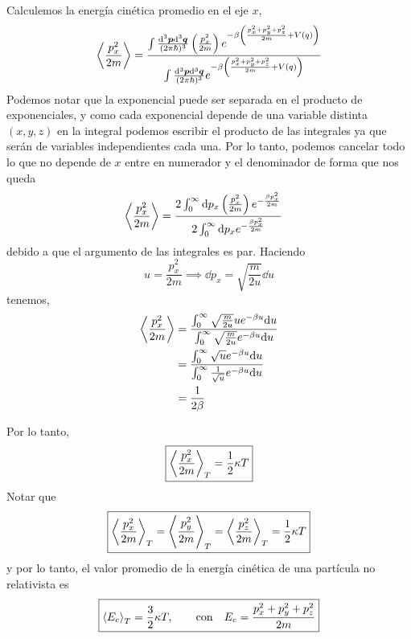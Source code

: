 Calculemos la energía cinética promedio en el eje $x$,
\begin{equation}
  \ev{\frac{p_x^2}{2m}}=\frac{\intpq\left(\frac{p_x^2}{2m}\right)e^{-\b\left(\frac{p_x^2+p_y^2+p_z^2}{2m}+V(q)\right)}}{\intpq e^{-\b\left(\frac{p_x^2+p_y^2+p_z^2}{2m}+V(q)\right)}}
\end{equation}
Podemos notar que la exponencial puede ser separada en el producto de exponenciales, y como cada exponencial depende de una variable distinta $(x,y,z)$ en la integral podemos escribir el producto de las integrales ya que serán de variables independientes cada una. Por lo tanto, podemos cancelar todo lo que no depende de $x$ entre en numerador y el denominador de forma que nos queda
\begin{align}
   \ev{\frac{p_x^2}{2m}}&=\frac{2\int_0^\infty \dd p_x\left(\frac{p_x^2}{2m}\right)e^{-\frac{\b p_x^2}{2m}}}{2\int_0^\infty \dd p_xe^{-\frac{\b p_x^2}{2m}}}
\end{align}
debido a que el argumento de las integrales es par.
Haciendo
\begin{equation}
  u=\frac{p_x^2}{2m}\implies \dd p_x=\sqrt{\frac{m}{2u}}\dd u
\end{equation}
tenemos,
\begin{align}
  \ev{\frac{p_x^2}{2m}}&=\frac{\int_0^\infty \sqrt{\frac{m}{2u}} u e^{-\b u}\dd u}{\int_0^\infty \sqrt{\frac{m}{2u}}e^{-\b u}\dd u}\\
  &=\frac{\int_0^\infty \sqrt{u} e^{-\b u}\dd u}{\int_0^\infty\frac{1}{\sqrt{u}} e^{-\b u}\dd u}\\
  &=\frac{1}{2\b }
\end{align}

Por lo tanto,
\begin{equation}
\boxed{  \ev{\frac{p_x^2}{2m}}_T=\frac{1}{2}\k T}
\end{equation}
Notar que
\begin{equation}
\boxed{  \ev{\frac{p_x^2}{2m}}_T=\ev{\frac{p_y^2}{2m}}_T=\ev{\frac{p_z^2}{2m}}_T=\frac{1}{2}\k T}
\end{equation}
y por lo tanto, el valor promedio de la energía cinética de una partícula no relativista es
\begin{equation}
 \boxed{ \ev{E_c}_T=\frac{3}{2}\k T,\qquad \text{con}\quad  E_c=\frac{p_x^2+p_y^2+p_z^2}{2m}}
\end{equation}

